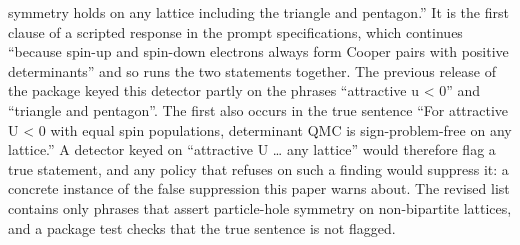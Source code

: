 \documentclass[
  11pt,
]{article}
\begin{document}
\begin{enumerate}
  symmetry holds on any lattice including the triangle and pentagon.''
  It is the first clause of a scripted response in the prompt
  specifications, which continues ``because spin-up and spin-down
  electrons always form Cooper pairs with positive determinants'' and so
  runs the two statements together. The previous release of the package
  keyed this detector partly on the phrases ``attractive u \textless{}
  0'' and ``triangle and pentagon''. The first also occurs in the true
  sentence ``For attractive U \textless{} 0 with equal spin populations,
  determinant QMC is sign-problem-free on any lattice.'' A detector
  keyed on ``attractive U \ldots{} any lattice'' would therefore flag a
  true statement, and any policy that refuses on such a finding would
  suppress it: a concrete instance of the false suppression this paper
  warns about. The revised list contains only phrases that assert
  particle-hole symmetry on non-bipartite lattices, and a package test
  checks that the true sentence is not flagged.


\end{enumerate}
\end{document}
